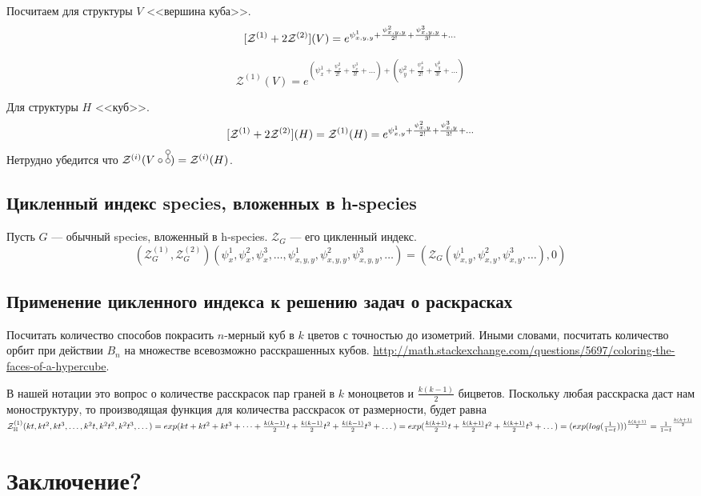 \begin{example}
Посчитаем для структуры $V$ <<вершина куба>>.
$$
[\mathcal Z^{(1)} + 2\mathcal Z^{(2)}](V) = e^{\psi_{x,y,y}^{1} + \frac{\psi_{x,y,y}^{2}}{2!} +
\frac{\psi_{x,y,y}^{3}}{3!} + \dots} 
$$

$$
\mathcal Z^{(1)}(V) = e^{(\psi_{x}^{1} + \frac{\psi_{x}^{2}}{2!} +
\frac{\psi_{x}^{3}}{3!} + \dots) + (\psi_{y}^{2} + \frac{\psi_{y}^{4}}{2!} +
\frac{\psi_{y}^{6}}{3!} + \dots)} 
$$

Для структуры $H$ <<куб>>.
$$
[\mathcal Z^{(1)} + 2\mathcal Z^{(2)}](H) = \mathcal Z^{(1)}(H) = e^{\psi_{x,y}^{1} +
\frac{\psi_{x,y}^{2}}{2!} + \frac{\psi_{x,y}^{3}}{3!} + \dots} 
$$
Нетрудно убедится что $\mathcal Z^{(i)}(V \circ \dA) = \mathcal Z^{(i)}(H)$.
\end{example}

\subsection{Цикленный индекс species, вложенных в h-species}
\begin{statement}
Пусть $G$ --- обычный species, вложенный в h-species. $\mathcal Z_G$ --- его
цикленный индекс.
$$(\mathcal Z^{(1)}_G, \mathcal Z^{(2)}_G)
(\psi_x^1, \psi_x^2, \psi_x^3, \dots, 
\psi_{x,y,y}^1, \psi_{x,y,y}^2, \psi_{x,y,y}^3, \dots)
 = (\mathcal Z_G(\psi_{x,y}^1, \psi_{x,y}^2, \psi_{x,y}^3, \dots), 0)$$
\end{statement}

\subsection{Применение цикленного индекса к решению задач о раскрасках}
\begin{problem}
Посчитать количество способов покрасить $n$-мерный куб в $k$ цветов с точностью
до изометрий. Иными словами, посчитать количество орбит при действии $B_n$ на
множестве всевозможно расскрашенных кубов. \url{http://math.stackexchange.com/questions/5697/coloring-the-faces-of-a-hypercube}.
\end{problem}
\begin{solution}
В нашей нотации это вопрос о количестве расскрасок пар граней в $k$ моноцветов и
$\frac{k(k-1)}{2}$ бицветов. Поскольку любая расскраска даст нам моноструктуру,
то производящая функция для количества расскрасок от размерности, будет равна
$\mathcal Z^{(1)}_{\mathbb H}(kt, kt^2, kt^3, \dots, k^2t,
k^2t^2, k^2t^3, \dots) = exp(kt + kt^2 + kt^3 + \dots
+ \frac{k(k-1)}{2}t + \frac{k(k-1)}{2}t^2 + \frac{k(k-1)}{2}t^3 + \dots) =
exp(\frac{k(k+1)}{2}t + \frac{k(k+1)}{2}t^2 + \frac{k(k+1)}{2}t^3 + \dots) =
(exp(log(\frac{1}{1-t})))^{\frac{k(k+1)}{2}} = \frac{1}{1-t}^{\frac{k(k+1)}{2}}$
\end{solution}

\section{Заключение?}
